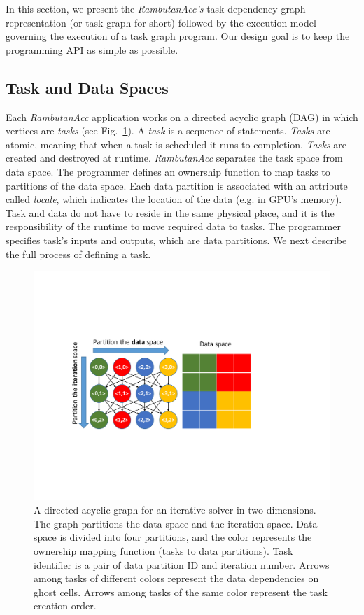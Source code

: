 In this section, we present the {\em RambutanAcc's} task dependency graph representation (or task graph for short) followed by the execution model governing the execution of a task graph program.
Our design goal is to keep the programming API as simple as possible.


\subsection{Task and Data Spaces}
Each {\em RambutanAcc} application works on a directed acyclic graph (DAG) in which vertices are {\em tasks} (see Fig.~\ref{fig:taskGraph}).
A {\em task} is a sequence of statements.
{\em Tasks} are atomic, meaning that when a task is scheduled it runs to completion.
{\em Tasks} are created and destroyed at runtime.
{\em RambutanAcc} separates the task space from data space.
The programmer defines an ownership function to map tasks to partitions of the data space.
Each data partition is associated with an attribute called {\em locale}, which indicates the location of the data (e.g. in GPU's memory).
Task and data do not have to reside in the same physical place, and it is the responsibility of the runtime to move required data to tasks.
The programmer specifies task's inputs and outputs, which are data partitions.
We next describe the full process of defining a task.


\begin{figure}[htb]
\centering
\includegraphics[width=.47\textwidth]{figures/taskGraph.pdf}
\caption{A directed acyclic graph for an iterative solver in two dimensions. The graph partitions the data space and the iteration space. Data space is divided into four partitions, and the color represents the ownership mapping function (tasks to data partitions). Task identifier is a pair of data partition ID and iteration number. Arrows among tasks of different colors represent the data dependencies on ghost cells. Arrows among tasks of the same color represent the task creation order.} 
\label{fig:taskGraph}
\end{figure}


